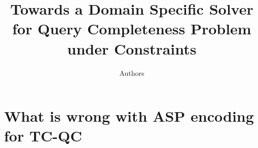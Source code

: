 \documentclass{article}
\author{Authors}
\title{Towards a Domain Specific Solver for Query Completeness Problem under Constraints}
\begin{document}
\maketitle

\section{What is wrong with ASP encoding for TC-QC}
\end{document}
